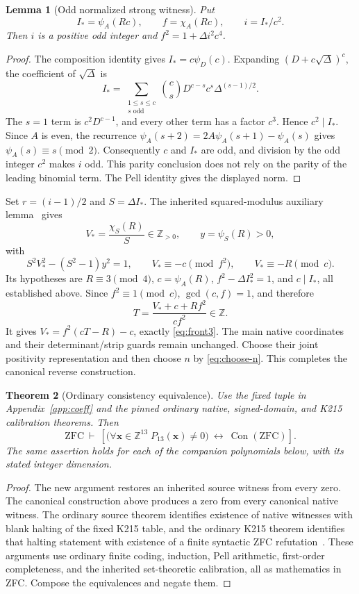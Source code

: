 \documentclass[11pt,a4paper]{article}
\newtheorem{theorem}{Theorem}[section]
\newtheorem{lemma}[theorem]{Lemma}
\theoremstyle{definition}\newtheorem{definition}[theorem]{Definition}
\theoremstyle{remark}\newtheorem{remark}[theorem]{Remark}
\newcommand{\Z}{\mathbb Z}\newcommand{\Q}{\mathbb Q}\newcommand{\N}{\mathbb N}
\newcommand{\Con}{\operatorname{Con}}\newcommand{\Refutation}{\operatorname{Ref}}
\numberwithin{equation}{section}
\begin{document}
\begin{lemma}[Odd normalized strong witness]\label{lem:normal}
Put
\[
I_*=\psi_A(Rc),\qquad f=\chi_A(Rc),\qquad i=I_*/c^2.
\]
Then \(i\) is a positive odd integer and
\(f^2=1+\Delta i^2c^4\).
\end{lemma}
\begin{proof}
The composition identity gives \(I_*=c\psi_D(c)\).
Expanding \((D+c\sqrt\Delta)^c\), the coefficient of
\(\sqrt\Delta\) is
\[
I_*=\sum_{\substack{1\le s\le c\\s\text{ odd}}}
 \binom cs D^{c-s}c^s\Delta^{(s-1)/2}.
\]
The \(s=1\) term is \(c^2D^{c-1}\), and every other term
has a factor \(c^3\). Hence \(c^2\mid I_*\).
Since \(A\) is even, the recurrence
\(\psi_A(s+2)=2A\psi_A(s+1)-\psi_A(s)\) gives
\(\psi_A(s)\equiv s\pmod2\).
Consequently \(c\) and \(I_*\) are odd, and division by the odd
integer \(c^2\) makes \(i\) odd. This parity conclusion does not
rely on the parity of the leading binomial term.
The Pell identity gives the displayed norm.
\end{proof}

Set \(r=(i-1)/2\) and \(S=\Delta I_*\).
The inherited squared-modulus auxiliary lemma~\cite{squared} gives
\[
V_*=\frac{\chi_S(R)}S\in\Z_{>0},\qquad y=\psi_S(R)>0,
\]
with
\[
S^2V_*^2-(S^2-1)y^2=1,\qquad
V_*\equiv-c\pmod{f^2},\qquad V_*\equiv-R\pmod c.
\]
Its hypotheses are \(R\equiv3\pmod4\), \(c=\psi_A(R)\),
\(f^2-\Delta I_*^2=1\), and \(c\mid I_*\), all established above.
Since \(f^2\equiv1\pmod c\), \(\gcd(c,f)=1\), and therefore
\[
T=\frac{V_*+c+Rf^2}{cf^2}\in\Z.
\]
It gives \(V_*=f^2(cT-R)-c\), exactly \eqref{eq:front3}.
The main native coordinates and their determinant/strip guards remain
unchanged. Choose their joint positivity representation and then choose
\(n\) by \eqref{eq:choose-n}. This completes the canonical reverse
construction.

\begin{theorem}[Ordinary consistency equivalence]\label{thm:consistency}
Use the fixed tuple in Appendix~\ref{app:coeff} and the pinned ordinary
native, signed-domain, and K215 calibration theorems. Then
\[
\mathrm{ZFC}\ \vdash\
\left[
  \bigl(\forall \mathbf x\in\Z^{13}\;
             P_{13}(\mathbf x)\ne0\bigr)
  \ \longleftrightarrow\ \Con(\mathrm{ZFC})
\right].
\]
The same assertion holds for each of the companion polynomials
below, with its stated integer dimension.
\end{theorem}
\begin{proof}
The new argument restores an inherited source witness from every zero.
The canonical construction above produces a zero from every canonical
native witness. The ordinary source theorem identifies existence of
native witnesses with blank halting of the fixed K215 table, and the
ordinary K215 theorem identifies that halting statement with existence
of a finite syntactic ZFC refutation~\cite{coeff,calibration}.
These arguments use ordinary finite coding, induction, Pell arithmetic,
first-order completeness, and the inherited set-theoretic calibration,
all as mathematics in ZFC. Compose the equivalences and negate them.
\end{proof}
\end{document}
